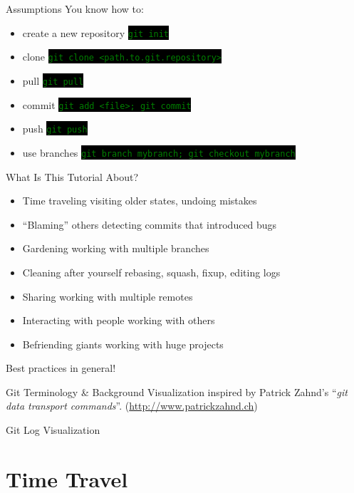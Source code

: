 \documentclass[
14pt,
aspectratio=169,
usenames,
dvipsnames,
x11names]{beamer}
\newcommand{\code}[1]{{\small\colorbox{black}{\textcolor{green}{\texttt{#1}}}}}
\newcommand{\buz}[2]{#1 \hfill \textcolor{Gray!50}{#2}}
\begin{document}
\begin{frame}{Assumptions}
  \alert{You} know how to:
  \begin{itemize}
  \item create a new repository \hfill \code{git init}
  \item clone \hfill \code{git clone <path.to.git.repository>}
  \item pull \hfill \code{git pull}
  \item commit \hfill \code{git add <file>; git commit}
  \item push \hfill \code{git push}
  \item use branches \hfill \code{git branch mybranch; git checkout mybranch}
  \end{itemize}
\end{frame}

\begin{frame}{What Is This Tutorial About?}
  \begin{itemize} \setlength{\itemsep}{\fill}
  \item \buz{Time traveling}{visiting older states, undoing mistakes}
  \item \buz{``Blaming'' others}{detecting commits that introduced bugs}
  \item \buz{Gardening}{working with multiple branches}
  \item \buz{Cleaning after yourself}{rebasing, squash, fixup, editing logs}
  \item \buz{Sharing}{working with multiple remotes}
  \item \buz{Interacting with people}{working with others}
  \item \buz{Befriending giants}{working with huge projects}
  \end{itemize}
  \centering
  \alert{Best practices} in general!
\end{frame}

\begin{frame}{Git Terminology \& Background}
  \centering
  \tiny
  Visualization inspired by Patrick Zahnd's ``\textit{git data transport commands}''. (\url{http://www.patrickzahnd.ch})
  \vfill
  \scriptsize
  
\end{frame}

\begin{frame}{Git Log Visualization}
  \centering
  
\end{frame}

\section{Time Travel}
\end{document}
